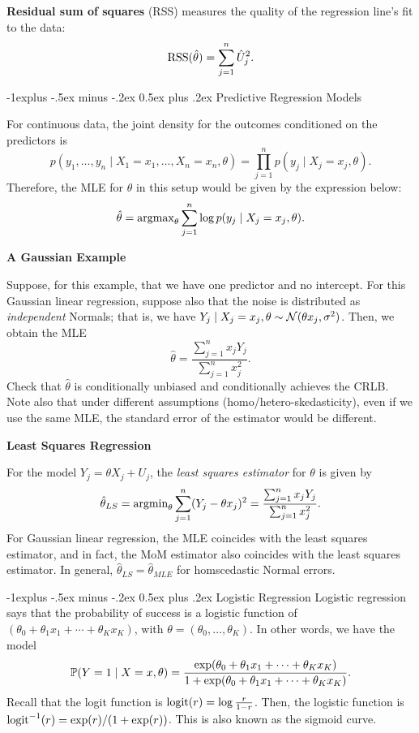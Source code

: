 \documentclass[10pt,landscape]{article}
\makeatletter
\renewcommand{\subsection}{\@startsection{subsection}{2}{0mm}%
                                {-1explus -.5ex minus -.2ex}%
                                {0.5ex plus .2ex}%
                                {\normalfont\normalsize\bfseries}}
\makeatother
\begin{document}
\begin{multicols*}{3}
\textbf{Residual sum of squares} (RSS) measures the quality of the regression line's fit to the data:$$\operatorname{RSS}(\hat{\theta})=\sum_{j=1}^n \hat{U}_j^2.$$

\subsection{Predictive Regression Models}

For continuous data, the joint density for the outcomes conditioned on the predictors is $$p(y_1,\dots,y_n\mid X_1=x_1,\dots,X_n=x_n,\theta)=\prod_{j=1}^n p(y_j\mid X_j=x_j,\theta).$$ Therefore, the MLE for $\theta$ in this setup would be given by the expression below: $$\hat{\theta}=\operatorname{argmax}_\theta \sum_{j=1}^n \log p(y_j\mid X_j=x_j,\theta).$$

\textbf{A Gaussian Example}

Suppose, for this example, that we have one predictor and no intercept. For this Gaussian linear regression, suppose also that the noise is distributed as \emph{independent} Normals; that is, we have $Y_j\mid X_j=x_j,\theta \sim \mathcal{N}(\theta x_j,\sigma^2)$. Then, we obtain the MLE $$\hat{\theta}=\frac{\sum_{j=1}^n x_jY_j}{\sum_{j=1}^n x_j^2}.$$ Check that $\hat{\theta}$ is conditionally unbiased and conditionally achieves the CRLB. Note also that under different assumptions (homo/hetero-skedasticity), even if we use the same MLE, the standard error of the estimator would be different.

\textbf{Least Squares Regression}

For the model $Y_j=\theta X_j+U_j$, the \emph{least squares estimator} for $\theta$ is given by $$\hat{\theta}_{LS}=\operatorname{argmin}_\theta \sum_{j=1}^n (Y_j-\theta x_j)^2=\frac{\sum_{j=1}^n x_jY_j}{\sum_{j=1}^n x_j^2}.$$ For Gaussian linear regression, the MLE coincides with the least squares estimator, and in fact, the MoM estimator also coincides with the least squares estimator. In general, $\hat\theta_{LS}=\hat\theta_{MLE}$ for homscedastic Normal errors.

\subsection{Logistic Regression}
Logistic regression says that the probability of success
is a logistic function of $(\theta_0 + \theta_1 x_1 +\cdots + \theta_K x_K)$, with $\theta= (\theta_0, \dots, \theta_K)$. In other words, we have the model $$\mathbb{P}(Y=1\mid X=x,\theta)=\frac{\exp(\theta_0 + \theta_1 x_1 +\cdots + \theta_K x_K)}{1+\exp(\theta_0 + \theta_1 x_1 +\cdots + \theta_K x_K)}.$$ Recall that the logit function is $\operatorname{logit}(r)=\log \frac{r}{1-r}$. Then, the logistic function is $\operatorname{logit}^{-1}(r)= \exp(r)/(1+\exp(r))$. This is also known as the sigmoid curve.


\end{multicols*}
\end{document}
